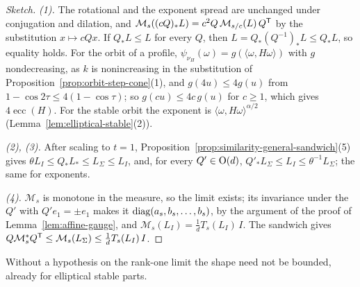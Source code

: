 \begin{proof}[Sketch]
\emph{(1).} The rotational and the exponent spread are unchanged under conjugation and dilation, and
$\mathcal M_s((cQ)_*L) = c^2Q\,\mathcal M_{s/c}(L)\,Q^{\mathsf{T}}$ by the substitution $x \mapsto cQx$. If
$Q_*L \le L$ for every $Q$, then $L = Q_*(Q^{-1})_*L \le Q_*L$, so equality holds. For the orbit of a profile, $\psi_{\nu_H}(\omega) = g(\langle\omega,H\omega\rangle)$
with $g$ nondecreasing, as $k$ is nonincreasing in the substitution of
Proposition~\ref{prop:orbit-step-cone}(1), and $g(4u) \le 4g(u)$ from $1 - \cos2\tau \le 4(1 - \cos\tau)$;
so $g(cu) \le 4c\,g(u)$ for $c \ge 1$, which gives $4\operatorname{ecc}(H)$. For the stable orbit the
exponent is $\langle\omega,H\omega\rangle^{\alpha/2}$ (Lemma~\ref{lem:elliptical-stable}(2)).

\emph{(2), (3).} After scaling to $t = 1$, Proposition~\ref{prop:similarity-general-sandwich}(5) gives
$\theta L_I \le Q_*L_* \le L_\Sigma \le L_I$, and, for every $Q' \in \mathrm{O}(d)$,
$Q'_*L_\Sigma \le L_I \le \theta^{-1}L_\Sigma$; the same for exponents.

\emph{(4).} $\mathcal M_s$ is monotone in the \Levy{} measure, so the limit exists; its invariance under
the $Q'$ with $Q'e_1 = \pm e_1$ makes it $\operatorname{diag}(a_s, b_s, \dots, b_s)$, by the argument of the proof of
Lemma~\ref{lem:affine-gauge}, and $\mathcal M_s(L_I) = \tfrac1dT_s(L_I)\,I$. The sandwich gives
$Q\mathcal M_s^*Q^{\mathsf{T}} \le \mathcal M_s(L_\Sigma) \le \tfrac1dT_s(L_I)\,I$.
\end{proof}

Without a hypothesis on the rank-one limit the shape need not be bounded, already for elliptical
stable parts.

